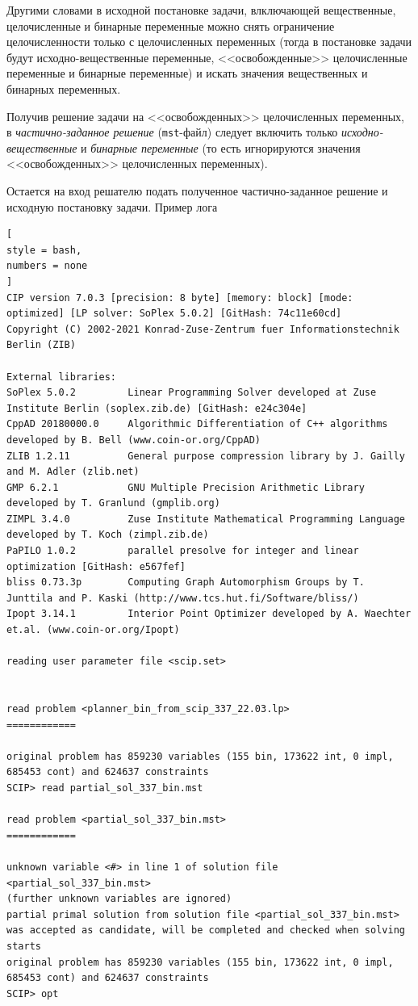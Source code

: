 \documentclass[%
	11pt,
	a4paper,
	utf8,
		]{article}
\begin{document}
Другими словами в исходной постановке задачи, влключающей вещественные, целочисленные и бинарные переменные можно снять ограничение целочисленности только с целочисленных переменных (тогда в постановке задачи будут исходно-вещественные переменные, <<освобожденные>> целочисленные переменные и бинарные переменные) и искать значения вещественных и бинарных переменных.

Получив решение задачи на <<освобожденных>> целочисленных переменных, в \emph{частично-заданное решение} (\verb|mst|-файл) следует включить только \emph{исходно-вещественные} и \emph{бинарные переменные} (то есть игнорируются значения <<освобожденных>> целочисленных переменных).

Остается на вход решателю подать полученное частично-заданное решение и исходную постановку задачи. Пример лога
\begin{lstlisting}[
style = bash,
numbers = none
]
CIP version 7.0.3 [precision: 8 byte] [memory: block] [mode: optimized] [LP solver: SoPlex 5.0.2] [GitHash: 74c11e60cd]
Copyright (C) 2002-2021 Konrad-Zuse-Zentrum fuer Informationstechnik Berlin (ZIB)

External libraries: 
SoPlex 5.0.2         Linear Programming Solver developed at Zuse Institute Berlin (soplex.zib.de) [GitHash: e24c304e]
CppAD 20180000.0     Algorithmic Differentiation of C++ algorithms developed by B. Bell (www.coin-or.org/CppAD)
ZLIB 1.2.11          General purpose compression library by J. Gailly and M. Adler (zlib.net)
GMP 6.2.1            GNU Multiple Precision Arithmetic Library developed by T. Granlund (gmplib.org)
ZIMPL 3.4.0          Zuse Institute Mathematical Programming Language developed by T. Koch (zimpl.zib.de)
PaPILO 1.0.2         parallel presolve for integer and linear optimization [GitHash: e567fef]
bliss 0.73.3p        Computing Graph Automorphism Groups by T. Junttila and P. Kaski (http://www.tcs.hut.fi/Software/bliss/)
Ipopt 3.14.1         Interior Point Optimizer developed by A. Waechter et.al. (www.coin-or.org/Ipopt)

reading user parameter file <scip.set>


read problem <planner_bin_from_scip_337_22.03.lp>
============

original problem has 859230 variables (155 bin, 173622 int, 0 impl, 685453 cont) and 624637 constraints
SCIP> read partial_sol_337_bin.mst

read problem <partial_sol_337_bin.mst>
============

unknown variable <#> in line 1 of solution file <partial_sol_337_bin.mst>
(further unknown variables are ignored)
partial primal solution from solution file <partial_sol_337_bin.mst> was accepted as candidate, will be completed and checked when solving starts
original problem has 859230 variables (155 bin, 173622 int, 0 impl, 685453 cont) and 624637 constraints
SCIP> opt


\end{lstlisting}
\end{document}
